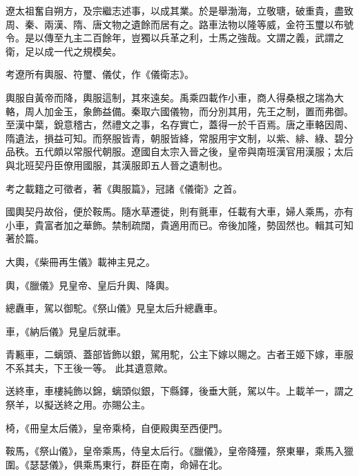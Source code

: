 
\begin{pinyinscope}

 遼太祖奮自朔方，及宗繼志述事，以成其業。於是舉渤海，立敬瑭，破重貴，盡致周、秦、兩漢、隋、唐文物之遺餘而居有之。路車法物以隆等威，金符玉璽以布號令。是以傳至九主二百餘年，豈獨以兵革之利，士馬之強哉。文謂之義，武謂之衛，足以成一代之規模矣。



 考遼所有輿服、符璽、儀仗，作《儀衛志》。



 輿服自黃帝而降，輿服這制，其來遠矣。禹乘四載作小車，商人得桑根之瑞為大輅，周人加金玉，象飾益備。秦取六國儀物，而分別其用，先王之制，置而弗御。至漢中葉，銳意稽古，然禮文之事，名存實亡，蓋得一於千百焉。唐之車輅因周、隋遺法，損益可知。而祭服皆青，朝服皆絳，常服用宇文制，以紫、緋、綠、碧分品秩。五代頗以常服代朝服。遼國自太宗入晉之後，皇帝與南班漢官用漢服；太后與北班契丹臣僚用國服，其漢服即五人晉之遺制也。



 考之載籍之可徵者，著《輿服篇》，冠諸《儀衛》之首。



 國輿契丹故俗，便於鞍馬。隨水草遷徙，則有氈車，任載有大車，婦人乘馬，亦有小車，貴富者加之華飾。禁制疏闊，貴適用而已。帝後加隆，勢固然也。輯其可知著於篇。



 大輿，《柴冊再生儀》載神主見之。



 輿，《臘儀》見皇帝、皇后升輿、降輿。



 總纛車，駕以御駝。《祭山儀》見皇太后升總纛車。



 車，《納后儀》見皇后就車。



 青甉車，二螭頭、蓋部皆飾以銀，駕用駝，公主下嫁以賜之。古者王姬下嫁，車服不系其夫，下王後一等。
 此其遺意歟。



 送終車，車樓純飾以錦，螭頭似銀，下縣鐸，後垂大氈，駕以牛。上載羊一，謂之祭羊，以擬送終之用。亦賜公主。



 椅，《冊皇太后儀》，皇帝乘椅，自便殿輿至西便門。



 鞍馬，《祭山儀》，皇帝乘馬，侍皇太后行。《臘儀》，皇帝降殭，祭東畢，乘馬入獵圍。《瑟瑟儀》，俱乘馬東行，群臣在南，命婦在北。




\end{pinyinscope}
